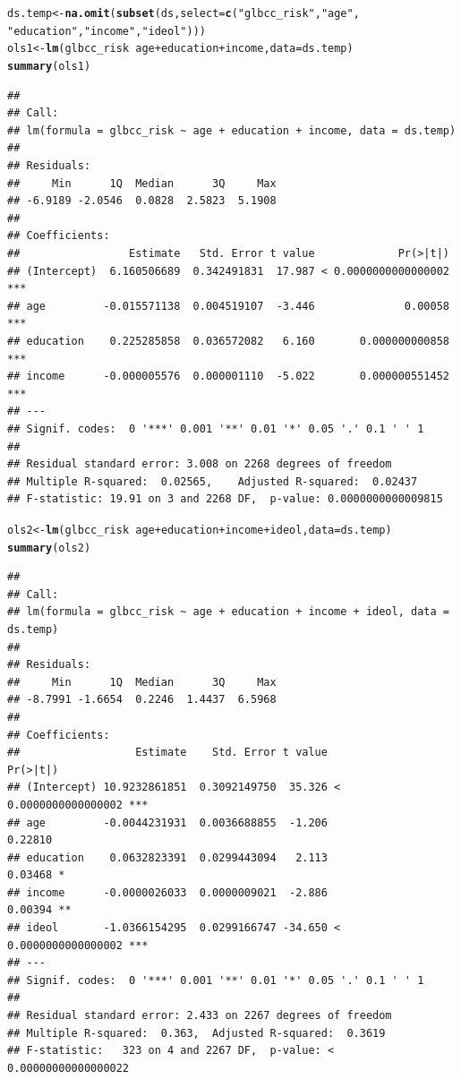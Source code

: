 \documentclass[11pt,openany]{book}\usepackage[]{graphicx}\usepackage[]{color}
\makeatletter
\newcommand{\hlstr}[1]{\textcolor[rgb]{0.192,0.494,0.8}{#1}}%
\newcommand{\hlopt}[1]{\textcolor[rgb]{0,0,0}{#1}}%
\newcommand{\hlstd}[1]{\textcolor[rgb]{0.345,0.345,0.345}{#1}}%
\newcommand{\hlkwb}[1]{\textcolor[rgb]{0.69,0.353,0.396}{#1}}%
\newcommand{\hlkwc}[1]{\textcolor[rgb]{0.333,0.667,0.333}{#1}}%
\newcommand{\hlkwd}[1]{\textcolor[rgb]{0.737,0.353,0.396}{\textbf{#1}}}%
\newenvironment{kframe}{%
 \def\at@end@of@kframe{}%
 \ifinner\ifhmode%
  \def\at@end@of@kframe{\end{minipage}}%
  \begin{minipage}{\columnwidth}%
 \fi\fi%
 \def\FrameCommand##1{\hskip\@totalleftmargin \hskip-\fboxsep
 \colorbox{shadecolor}{##1}\hskip-\fboxsep
     \hskip-\linewidth \hskip-\@totalleftmargin \hskip\columnwidth}%
 \MakeFramed {\advance\hsize-\width
   \@totalleftmargin\z@ \linewidth\hsize
   \@setminipage}}%
 {\par\unskip\endMakeFramed%
 \at@end@of@kframe}
\newenvironment{knitrout}{}{} %
\renewenvironment{knitrout}{\begin{singlespace}}{\end{singlespace}} %
\makeatother
\begin{document}
\begin{knitrout}
\color{fgcolor}\begin{kframe}
\begin{alltt}
\hlstd{ds.temp} \hlkwb{<-} \hlkwd{na.omit}\hlstd{(}\hlkwd{subset}\hlstd{(ds,} \hlkwc{select} \hlstd{=} \hlkwd{c}\hlstd{(}\hlstr{"glbcc_risk"}\hlstd{,} \hlstr{"age"}\hlstd{,}
    \hlstr{"education"}\hlstd{,} \hlstr{"income"}\hlstd{,} \hlstr{"ideol"}\hlstd{)))}
\hlstd{ols1} \hlkwb{<-} \hlkwd{lm}\hlstd{(glbcc_risk} \hlopt{~} \hlstd{age} \hlopt{+} \hlstd{education} \hlopt{+} \hlstd{income,} \hlkwc{data} \hlstd{= ds.temp)}
\hlkwd{summary}\hlstd{(ols1)}
\end{alltt}
\begin{verbatim}
## 
## Call:
## lm(formula = glbcc_risk ~ age + education + income, data = ds.temp)
## 
## Residuals:
##     Min      1Q  Median      3Q     Max 
## -6.9189 -2.0546  0.0828  2.5823  5.1908 
## 
## Coefficients:
##                 Estimate   Std. Error t value             Pr(>|t|)    
## (Intercept)  6.160506689  0.342491831  17.987 < 0.0000000000000002 ***
## age         -0.015571138  0.004519107  -3.446              0.00058 ***
## education    0.225285858  0.036572082   6.160       0.000000000858 ***
## income      -0.000005576  0.000001110  -5.022       0.000000551452 ***
## ---
## Signif. codes:  0 '***' 0.001 '**' 0.01 '*' 0.05 '.' 0.1 ' ' 1
## 
## Residual standard error: 3.008 on 2268 degrees of freedom
## Multiple R-squared:  0.02565,	Adjusted R-squared:  0.02437 
## F-statistic: 19.91 on 3 and 2268 DF,  p-value: 0.0000000000009815
\end{verbatim}
\begin{alltt}
\hlstd{ols2} \hlkwb{<-} \hlkwd{lm}\hlstd{(glbcc_risk} \hlopt{~} \hlstd{age} \hlopt{+} \hlstd{education} \hlopt{+} \hlstd{income} \hlopt{+} \hlstd{ideol,} \hlkwc{data} \hlstd{= ds.temp)}
\hlkwd{summary}\hlstd{(ols2)}
\end{alltt}
\begin{verbatim}
## 
## Call:
## lm(formula = glbcc_risk ~ age + education + income + ideol, data = ds.temp)
## 
## Residuals:
##     Min      1Q  Median      3Q     Max 
## -8.7991 -1.6654  0.2246  1.4437  6.5968 
## 
## Coefficients:
##                  Estimate    Std. Error t value             Pr(>|t|)    
## (Intercept) 10.9232861851  0.3092149750  35.326 < 0.0000000000000002 ***
## age         -0.0044231931  0.0036688855  -1.206              0.22810    
## education    0.0632823391  0.0299443094   2.113              0.03468 *  
## income      -0.0000026033  0.0000009021  -2.886              0.00394 ** 
## ideol       -1.0366154295  0.0299166747 -34.650 < 0.0000000000000002 ***
## ---
## Signif. codes:  0 '***' 0.001 '**' 0.01 '*' 0.05 '.' 0.1 ' ' 1
## 
## Residual standard error: 2.433 on 2267 degrees of freedom
## Multiple R-squared:  0.363,	Adjusted R-squared:  0.3619 
## F-statistic:   323 on 4 and 2267 DF,  p-value: < 0.00000000000000022
\end{verbatim}
\end{kframe}
\end{knitrout}
\end{document}
